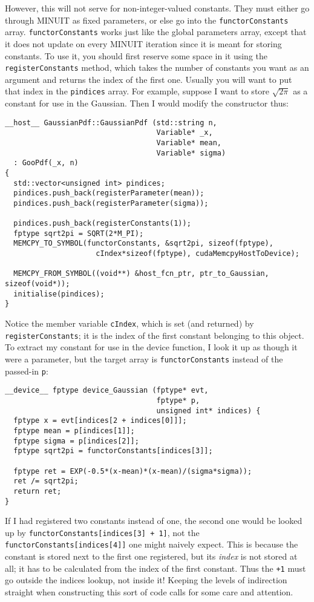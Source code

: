 \documentclass[12pt,pdflatex]{article}
\begin{document}
However, this will not serve for non-integer-valued constants. They must either
go through MINUIT as fixed parameters, or else go into the \texttt{functorConstants}
array. \verb|functorConstants| works just like the global parameters
array, except that it does not update on every MINUIT iteration since
it is meant for storing constants. To use it, you should first reserve
some space in it using the \verb|registerConstants| method, which takes
the number of constants you want as an argument and returns the index
of the first one. Usually you will want to put that index in the \verb|pindices|
array. For example, suppose I want to store $\sqrt{2\pi}$ as a constant
for use in the Gaussian. Then I would modify the constructor thus:
\begin{verbatim}
__host__ GaussianPdf::GaussianPdf (std::string n, 
                                   Variable* _x, 
                                   Variable* mean, 
                                   Variable* sigma) 
  : GooPdf(_x, n) 
{
  std::vector<unsigned int> pindices;
  pindices.push_back(registerParameter(mean));
  pindices.push_back(registerParameter(sigma));

  pindices.push_back(registerConstants(1)); 
  fptype sqrt2pi = SQRT(2*M_PI);
  MEMCPY_TO_SYMBOL(functorConstants, &sqrt2pi, sizeof(fptype), 
                     cIndex*sizeof(fptype), cudaMemcpyHostToDevice); 

  MEMCPY_FROM_SYMBOL((void**) &host_fcn_ptr, ptr_to_Gaussian, sizeof(void*));
  initialise(pindices); 
}
\end{verbatim}
Notice the member variable \verb|cIndex|, which is set (and returned) by \verb|registerConstants|; it is the
index of the first constant belonging to this object. To extract my constant for
use in the device function, I look it up as though it were a parameter, but the
target array is \verb|functorConstants| instead of the passed-in \verb|p|:
\begin{verbatim}
__device__ fptype device_Gaussian (fptype* evt, 
                                   fptype* p, 
                                   unsigned int* indices) {
  fptype x = evt[indices[2 + indices[0]]]; 
  fptype mean = p[indices[1]];
  fptype sigma = p[indices[2]];
  fptype sqrt2pi = functorConstants[indices[3]];

  fptype ret = EXP(-0.5*(x-mean)*(x-mean)/(sigma*sigma));
  ret /= sqrt2pi; 
  return ret; 
}
\end{verbatim}

If I had registered two constants instead of one, the second one would be looked
up by \verb|functorConstants[indices[3] + 1]|, not the \texttt{functorConstants[indices[4]]}
one might naively expect. This is because the constant is stored next to the first one
registered, but its \emph{index} is not stored at all; it has to be calculated from the
index of the first constant. Thus the \verb|+1| must go outside the indices lookup,
not inside it! Keeping the levels of indirection
straight when constructing this sort of code calls for some care and attention. 
\end{document}
